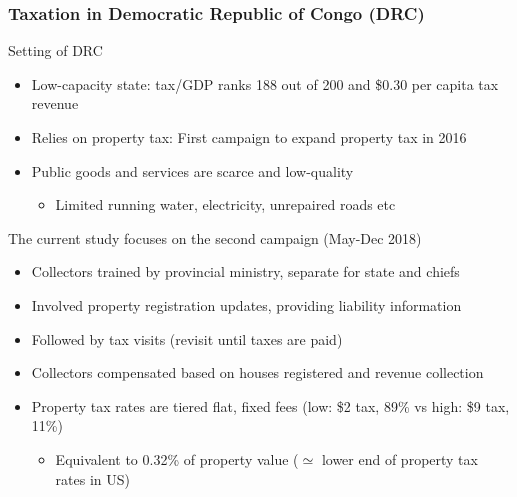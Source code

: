 \documentclass[aspectratio=169]{beamer}
\begin{document}
\begin{frame}
\frametitle{Taxation in Democratic Republic of Congo (DRC)} 
Setting of DRC
\begin{itemize}\setlength\itemsep{3pt}
\item Low-capacity state: tax/GDP ranks 188 out of 200 and  \$0.30 per capita tax revenue
\item Relies on property tax: First campaign to expand property tax in 2016
\item Public goods and services are scarce and low-quality
\begin{itemize}
\item Limited running water, electricity, unrepaired roads etc
\end{itemize}
\end{itemize}\medskip
The current study focuses on the second campaign (May-Dec 2018)
\begin{itemize}\setlength\itemsep{3pt}
\item Collectors trained by provincial ministry, separate for state and chiefs
\item Involved property registration updates, providing liability information 
\item Followed by tax visits (revisit until taxes are paid)
\item Collectors compensated based on houses registered and revenue collection
\item Property tax rates are tiered flat, fixed fees (low: \$2 tax, 89\% vs high: \$9 tax, 11\%)
\begin{itemize}
\item Equivalent to 0.32\% of property value ($\simeq$ lower end of property tax rates in US)
\end{itemize}
\end{itemize}\medskip
\end{frame}
\end{document}
